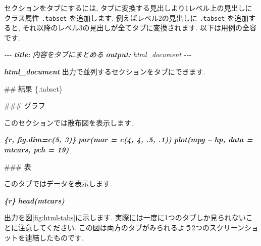 \documentclass[
  11pt,
  lualatex,
  ja=standard]{bxjsreport}
\newenvironment{Shaded}{\begin{snugshade}}{\end{snugshade}}
\newcommand{\AnnotationTok}[1]{\textcolor[rgb]{0.56,0.35,0.01}{\textbf{\textit{#1}}}}
\newcommand{\CommentTok}[1]{\textcolor[rgb]{0.56,0.35,0.01}{\textit{#1}}}
\newcommand{\FunctionTok}[1]{\textcolor[rgb]{0.00,0.00,0.00}{#1}}
\newcommand{\InformationTok}[1]{\textcolor[rgb]{0.56,0.35,0.01}{\textbf{\textit{#1}}}}
\newcommand{\NormalTok}[1]{#1}
\begin{document}
セクションをタブにするには, タブに変換する見出しより1レベル上の見出しにクラス属性 \texttt{.tabset} を追加します. 例えばレベル2の見出しに \texttt{.tabset} を追加すると, それ以降のレベル3の見出しが全てタブに変換されます. 以下は用例の全容です.

\begin{Shaded}
\begin{Highlighting}[]
\CommentTok{{-}{-}{-}}
\AnnotationTok{title:}\CommentTok{ 内容をタブにまとめる}
\AnnotationTok{output:}\CommentTok{ html\_document}
\CommentTok{{-}{-}{-}}

\InformationTok{\textasciigrave{}html\_document\textasciigrave{}}\NormalTok{ 出力で並列するセクションをタブにできます.}

\FunctionTok{\#\# 結果 \{.tabset\}}

\FunctionTok{\#\#\# グラフ}

\NormalTok{このセクションでは散布図を表示します.}

\InformationTok{\textasciigrave{}\textasciigrave{}\textasciigrave{}\{r, fig.dim=c(5, 3)\}}
\InformationTok{par(mar = c(4, 4, .5, .1))}
\InformationTok{plot(mpg \textasciitilde{} hp, data = mtcars, pch = 19)}
\InformationTok{\textasciigrave{}\textasciigrave{}\textasciigrave{}}

\FunctionTok{\#\#\# 表}

\NormalTok{このタブではデータを表示します.}

\InformationTok{\textasciigrave{}\textasciigrave{}\textasciigrave{}\{r\}}
\InformationTok{head(mtcars)}
\InformationTok{\textasciigrave{}\textasciigrave{}\textasciigrave{}}
\end{Highlighting}
\end{Shaded}

出力を図\ref{fig:html-tabs}に示します. 実際には一度に1つのタブしか見られないことに注意してください. この図は両方のタブがみられるよう2つのスクリーンショットを連結したものです.
\end{document}
